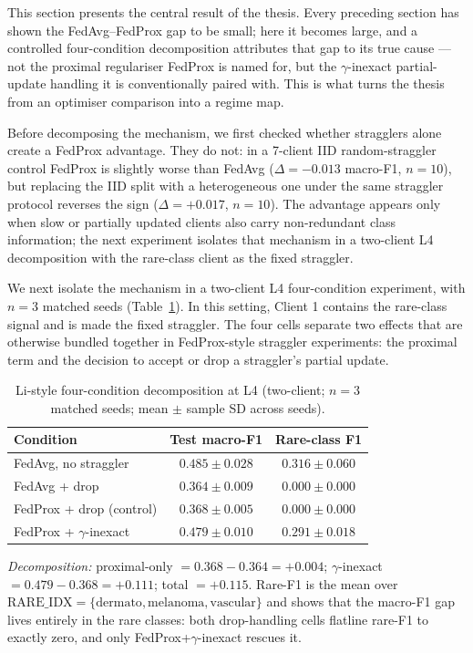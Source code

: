 \documentclass[11pt,a4paper]{report}
\begin{document}
This section presents the central result of the thesis. Every preceding
section has shown the FedAvg--FedProx gap to be small; here it becomes
large, and a controlled four-condition decomposition attributes that gap
to its true cause --- not the proximal regulariser FedProx is named for,
but the $\gamma$-inexact partial-update handling it is conventionally
paired with. This is what turns the thesis from an optimiser comparison
into a regime map.

Before decomposing the mechanism, we first checked whether stragglers alone
create a FedProx advantage. They do not: in a 7-client IID random-straggler
control FedProx is slightly worse than FedAvg ($\Delta = -0.013$ macro-F1,
$n = 10$), but replacing the IID split with a heterogeneous one under the same
straggler protocol reverses the sign ($\Delta = +0.017$, $n = 10$). The advantage
appears only when slow or partially updated clients also carry non-redundant
class information; the next experiment isolates that mechanism in a two-client L4
decomposition with the rare-class client as the fixed straggler.

We next isolate the mechanism in a two-client L4 four-condition experiment,
with $n=3$ matched seeds (Table~\ref{tab:li-decomp-l4}). In this setting,
Client 1 contains the rare-class signal and is made the fixed straggler. The
four cells separate two effects that are otherwise bundled together in
FedProx-style straggler experiments: the proximal term and the decision to
accept or drop a straggler's partial update.

\begin{table}[H]
\centering
\caption{Li-style four-condition decomposition at L4 (two-client; $n=3$
matched seeds; mean $\pm$ sample SD across seeds).}
\label{tab:li-decomp-l4}
\small
\begin{tabular}{lcc}
\toprule
Condition                                       & Test macro-F1                & Rare-class F1 \\
\midrule
FedAvg, no straggler                            & $0.485 \pm 0.028$            & $0.316 \pm 0.060$ \\
FedAvg + drop                                   & $0.364 \pm 0.009$            & $0.000 \pm 0.000$ \\
FedProx + drop (control)                        & $0.368 \pm 0.005$            & $0.000 \pm 0.000$ \\
FedProx + $\gamma$-inexact                      & $\mathbf{0.479 \pm 0.010}$   & $\mathbf{0.291 \pm 0.018}$ \\
\bottomrule
\end{tabular}

\smallskip
\noindent\textit{Decomposition:} proximal-only $= 0.368 - 0.364 = +0.004$;
$\gamma$-inexact $= 0.479 - 0.368 = +0.111$; total $= +0.115$. Rare-F1 is
the mean over $\mathrm{RARE\_IDX} = \{\text{dermato}, \text{melanoma},
\text{vascular}\}$ and shows that the macro-F1 gap lives entirely in the
rare classes: both drop-handling cells flatline rare-F1 to exactly zero,
and only FedProx+$\gamma$-inexact rescues it.
\end{table}
\end{document}
